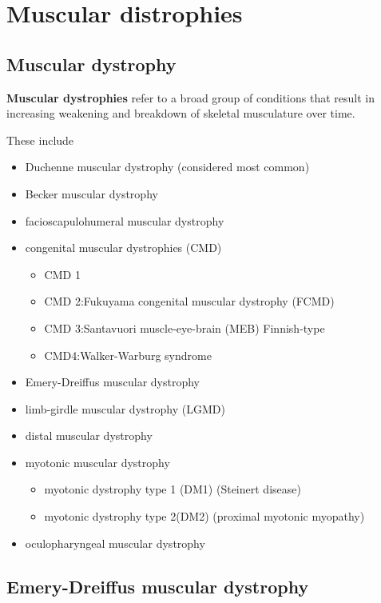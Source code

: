 \chapter{Muscular distrophies}

\section{Muscular dystrophy}

\textbf{Muscular dystrophies} refer to a broad group of conditions that result in increasing weakening and breakdown of skeletal musculature over time.

These include

\begin{itemize}
	\tightlist
	\item
	Duchenne muscular dystrophy (considered most common)
	\item
	Becker muscular dystrophy
	\item
	facioscapulohumeral muscular dystrophy
	\item
	congenital muscular dystrophies (CMD)
	
	\begin{itemize}
		\tightlist
		\item
		CMD 1
		\item
		CMD 2:Fukuyama congenital muscular dystrophy (FCMD)
		\item
		CMD 3:Santavuori muscle-eye-brain (MEB) Finnish-type
		\item
		CMD4:Walker-Warburg syndrome
	\end{itemize}
	\item
	Emery-Dreiffus muscular dystrophy
	\item
	limb-girdle muscular dystrophy (LGMD)
	\item
	distal muscular dystrophy
	\item
	myotonic muscular dystrophy
	
	\begin{itemize}
		\tightlist
		\item
		myotonic dystrophy type 1 (DM1) (Steinert disease)
		\item
		myotonic dystrophy type 2(DM2) (proximal myotonic myopathy)
	\end{itemize}
	\item
	oculopharyngeal muscular dystrophy
\end{itemize}

\section{Emery-Dreiffus muscular dystrophy}

